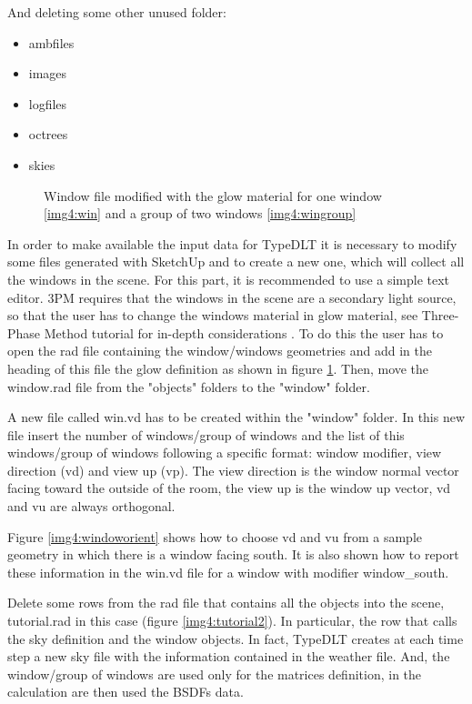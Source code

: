 And deleting some other unused folder:
\begin{itemize}
\renewcommand{\labelitemi}{\tiny$\blacksquare$}
\item ambfiles
\item images
\item logfiles
\item octrees
\item skies
\end{itemize}

\begin{figure}[h] 
  \caption{\label{img4:winglow} Window file modified with the glow material for one window \ref{img4:win} and a group of two windows \ref{img4:wingroup}}
\end{figure}

In order to make available the input data for TypeDLT it is necessary to modify some files generated with SketchUp and to create a new one, which will collect all the windows in the scene. For this part, it is recommended to use a simple text editor. 3PM requires that the windows in the scene are a secondary light source, so that the user has to change the windows material in glow material, see Three-Phase Method tutorial for in-depth considerations \cite{3ph_tut}. To do this the user has to open the rad file containing the window/windows geometries and add in the heading of this file the glow definition as shown in figure \ref{img4:winglow}. Then, move the window.rad file from the "objects" folders to the "window" folder.

A new file called {\color{blue} win.vd} has to be created within the "window" folder. In this new file insert the number of windows/group of windows and the list of this windows/group of windows following a specific format: window modifier, view direction (vd) and view up (vp). The view direction is the window normal vector facing toward the outside of the room, the view up is the window up vector, vd and vu are always orthogonal.

Figure \ref{img4:windoworient} shows how to choose vd and vu from a sample geometry in which there is a window facing south. It is also shown how to report these information in the win.vd file for a window with modifier window\_south. 

Delete some rows from the rad file that contains all the objects into the scene, tutorial.rad in this case (figure \ref{img4:tutorial2}). In particular, the row that calls the sky definition and the window objects. In fact, TypeDLT creates at each time step a new sky file with the information contained in the weather file. And, the window/group of windows are used only for the matrices definition, in the calculation are then used the BSDFs data.

